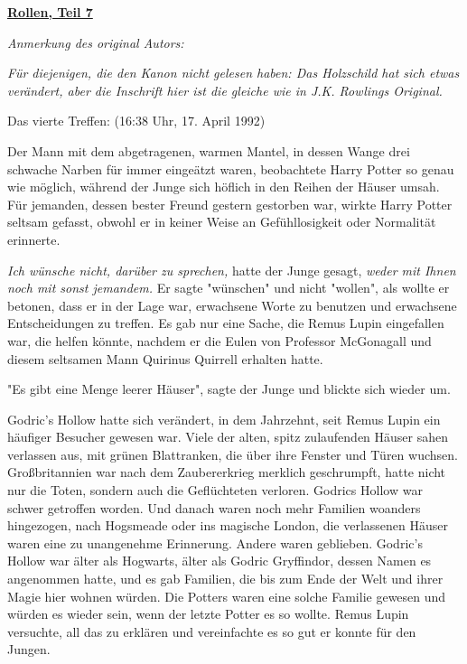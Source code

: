 

\hypertarget{rollen-teil-7}{%

\textbf{\uline{Rollen, Teil 7}}

\emph{Anmerkung des original Autors:}

\emph{Für diejenigen, die den Kanon nicht gelesen haben: Das Holzschild hat sich etwas verändert, aber die Inschrift hier ist die gleiche wie in J.K. Rowlings Original.}

Das vierte Treffen: (16:38 Uhr, 17. April 1992)

Der Mann mit dem abgetragenen, warmen Mantel, in dessen Wange drei schwache Narben für immer eingeätzt waren, beobachtete Harry Potter so genau wie möglich, während der Junge sich höflich in den Reihen der Häuser umsah. Für jemanden, dessen bester Freund gestern gestorben war, wirkte Harry Potter seltsam gefasst, obwohl er in keiner Weise an Gefühllosigkeit oder Normalität erinnerte.

\emph{Ich wünsche nicht, darüber zu sprechen,} hatte der Junge gesagt, \emph{weder mit Ihnen noch mit sonst jemandem.} Er sagte "wünschen" und nicht "wollen", als wollte er betonen, dass er in der Lage war, erwachsene Worte zu benutzen und erwachsene Entscheidungen zu treffen. Es gab nur eine Sache, die Remus Lupin eingefallen war, die helfen könnte, nachdem er die Eulen von Professor McGonagall und diesem seltsamen Mann Quirinus Quirrell erhalten hatte.

"Es gibt eine Menge leerer Häuser", sagte der Junge und blickte sich wieder um.

Godric's Hollow hatte sich verändert, in dem Jahrzehnt, seit Remus Lupin ein häufiger Besucher gewesen war. Viele der alten, spitz zulaufenden Häuser sahen verlassen aus, mit grünen Blattranken, die über ihre Fenster und Türen wuchsen. Großbritannien war nach dem Zaubererkrieg merklich geschrumpft, hatte nicht nur die Toten, sondern auch die Geflüchteten verloren. Godrics Hollow war schwer getroffen worden. Und danach waren noch mehr Familien woanders hingezogen, nach Hogsmeade oder ins magische London, die verlassenen Häuser waren eine zu unangenehme Erinnerung. Andere waren geblieben. Godric's Hollow war älter als Hogwarts, älter als Godric Gryffindor, dessen Namen es angenommen hatte, und es gab Familien, die bis zum Ende der Welt und ihrer Magie hier wohnen würden. Die Potters waren eine solche Familie gewesen und würden es wieder sein, wenn der letzte Potter es so wollte. Remus Lupin versuchte, all das zu erklären und vereinfachte es so gut er konnte für den Jungen.

}
